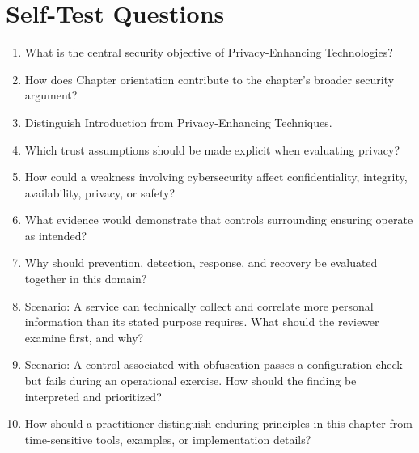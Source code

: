 \documentclass[11pt]{article}
\begin{document}
\section*{Self-Test Questions}
\begin{enumerate}
\item What is the central security objective of Privacy-Enhancing Technologies?
\item How does Chapter orientation contribute to the chapter's broader security argument?
\item Distinguish Introduction from Privacy-Enhancing Techniques.
\item Which trust assumptions should be made explicit when evaluating privacy?
\item How could a weakness involving cybersecurity affect confidentiality, integrity, availability, privacy, or safety?
\item What evidence would demonstrate that controls surrounding ensuring operate as intended?
\item Why should prevention, detection, response, and recovery be evaluated together in this domain?
\item Scenario: A service can technically collect and correlate more personal information than its stated purpose requires. What should the reviewer examine first, and why?
\item Scenario: A control associated with obfuscation passes a configuration check but fails during an operational exercise. How should the finding be interpreted and prioritized?
\item How should a practitioner distinguish enduring principles in this chapter from time-sensitive tools, examples, or implementation details?
\end{enumerate}
\end{document}
